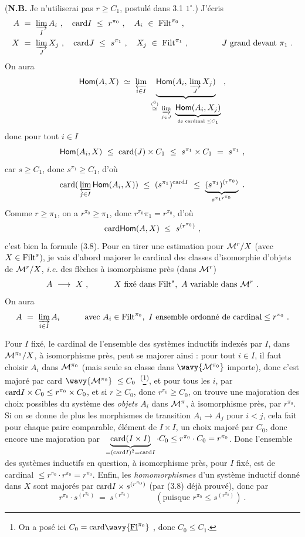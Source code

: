 (\textbf{N.B.} Je n'utiliserai pas $r\geq C_1$, postulé dans 3.1 $1^\circ$.) J'écris
\[
\begin{aligned}
A\ &=\ \varinjlim_I A_i\ ,\quad \mathrm{card} I\ \leq\ r^{\pi_0}\ ,\quad A_i\ \in\ \mathrm{Filt}^{\pi_0}\ ,\\
X\ &=\ \varinjlim_J X_j\ ,\quad \mathrm{card} J\ \leq\ s^{\pi_1}\ ,\quad X_j\ \in\ \mathrm{Filt}^{\pi_1}\ ,\qquad\qquad J\text{ grand devant }\pi_1\ .
\end{aligned}
\]
On aura
\[
\Hom(A,X)\ \simeq\ \varprojlim_{i\in I}\ \underbrace{\Hom(A_i,\,\varinjlim_J X_j)}_{\overset{(\text{\footnotemark[6]})}{\simeq}\ \varinjlim\limits_{j\in J}\ \underbrace{\Hom(A_i,X_j)}_{\text{de cardinal }\leq C_1}}\ ,
\]
donc pour tout $i\in I$
\[
\mathsf{Hom}(A_i,X)\ \leq\ \mathrm{card}(J)\times C_1\ \leq\ s^{\pi_1}\times C_1\ =\ s^{\pi_1}\ ,
\]
car $s\geq C_1$, donc $s^{\pi_1}\geq C_1$, d'où
\[
\card(\,\varprojlim_{j\in I}\Hom(A_i,X))\ \leq\ (s^{\pi_1})^{\card I}\ \leq\ \underbrace{(s^{\pi_1})^{(r^{\pi_0})}}_{s^{\pi_1 r^{\pi_0}}}\ . %
\]
Comme $r\geq\pi_1$, on a $r^{\pi_0}\geq\pi_1$, donc $r^{\pi_0}\pi_1=r^{\pi_0}$, d'où
\[
\mathrm{card}\mathsf{Hom}(A,X)\ \leq\ s^{(r^{\pi_0})}\ ,
\]
c'est bien la formule (3.8). Pour en tirer une estimation pour $\mathcal{M}^r/X$ (avec $X\in\mathrm{Filt}^s$),  je vais d'abord majorer le cardinal des classes d'isomorphie d'objets de $\mathcal{M}^r/X$, \textit{i.e.} des flèches à isomorphisme près (dans $\mathcal{M}^r$)
\[
A\ \longrightarrow\ X\ ,\qquad\quad X\text{ fixé dans }\mathrm{Filt}^s,\ A\text{ variable dans }\mathcal{M}^r\ .
\]
On aura
\[
A\ =\ \varinjlim_{i\in I} A_i\qquad\quad\text{avec } A_i\in\mathrm{Filt}^{\pi_0},\ I\text{ ensemble ordonné de cardinal}\leq r^{\pi_0}\ .
\]

Pour $I$ fixé, le cardinal de l'ensemble des systèmes inductifs indexés par $I$, dans $\mathcal{M}^{\pi_0}/X$, à isomorphisme près, peut se majorer ainsi : pour tout $i\in I$, il faut choisir $A_i$ dans $\mathcal{M}^{\pi_0}$ (mais seule sa classe dans $\wavy{\M^{\pi_0}}$ importe), donc c'est majoré par card $\wavy{\M^{\pi_0}}\ \leq C_0$~\textsuperscript{(}\footnote[7]{On a posé ici $C_0=\card\wavy{\uFl^{\pi_0}}$ , donc $C_0\leq C_1$.}\textsuperscript{)}, et pour tous les $i$, par $\mathrm{card} I\times C_0\leq r^{\pi_0}\times C_0$, et si $r\geq C_0$, donc $r^{\pi_0}\geq C_0$, on trouve une majoration des choix possibles du système des \textit{objets} $A_i$ dans $\mathcal{M}^\pi$, à isomorphisme près, par $r^{\pi_0}$. Si on se donne de plus les morphismes de transition $A_i\longrightarrow A_j$ pour $i<j$, cela fait pour chaque paire comparable, élément de $I\times I$, un choix majoré par $C_0$, donc encore une majoration par $\ \underbrace{\mathrm{card}(I\times I)}_{=(\mathrm{card} I)^2=\mathrm{card} I}\cdot C_0\leq r^{\pi_0}\cdot C_0=r^{\pi_0}$. Donc l'ensemble des systèmes inductifs en question, à isomorphisme près, pour $I$ fixé, est de cardinal $\leq r^{\pi_0}\cdot r^{\pi_0}=r^{\pi_0}$. Enfin, les \textit{homomorphismes} d'un système inductif donné dans $X$ sont majorés par $\mathrm{card} I\times s^{(r^{\pi_0})}$ (par (3.8) déjà prouvé), donc par
\[
r^{\pi_0}\cdot s^{(r^{\pi_0})}\ =\ s^{(r^{\pi_0})}\qquad\quad(\text{puisque } r^{\pi_0}\leq s^{(r^{\pi_0})})\ .
\]

